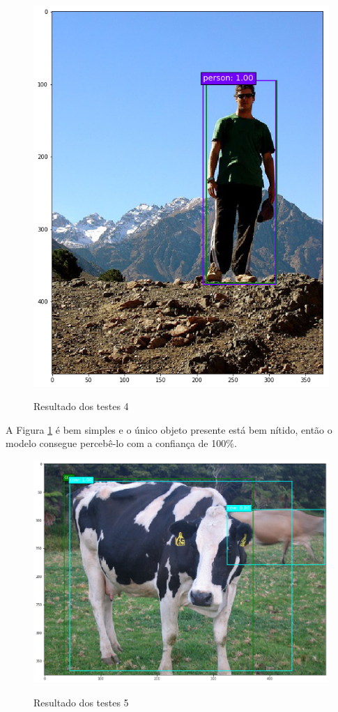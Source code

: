 \begin{figure}[H]
	\setlength{\abovecaptionskip}{0pt}
	\setlength{\belowcaptionskip}{0pt}
	\caption[Resultado dos testes 4]{Resultado dos testes 4}
	\centering
	\includegraphics[width=.6\textwidth]{imagem/test_image_2.png}
	\captionsetup{justification=centering}
	\label{fig:teste_4}
\end{figure}

A Figura \ref{fig:teste_4} é bem simples e o único objeto presente está bem nítido, então o modelo consegue percebê-lo com a confiança de 100\%.

\begin{figure}[H]
	\setlength{\abovecaptionskip}{0pt}
	\setlength{\belowcaptionskip}{0pt}
	\caption[Resultado dos testes 5]{Resultado dos testes 5}
	\centering
	\includegraphics[width=.6\textwidth]{imagem/test_image_4.png}
	\captionsetup{justification=centering}
	\label{fig:teste_5}
\end{figure}

